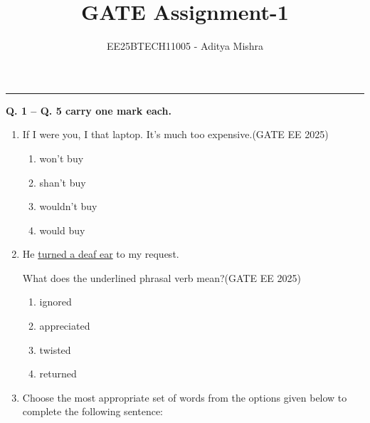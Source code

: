 



\title{GATE Assignment-1}
\author{EE25BTECH11005 - Aditya Mishra}
\maketitle
{\let\newpage\relax\maketitle}
\rule{\columnwidth}{0.3pt}

\textbf{Q. 1 -- Q. 5 carry one mark each.}

\begin{enumerate}
\item If I were you, I \underline{\hspace{2.5cm}} that laptop. It’s much too expensive.\hfill {(GATE EE 2025)}

\begin{multicols}{2}
\begin{enumerate}
\item won’t buy
\item shan’t buy
\item wouldn’t buy
\item would buy
\end{enumerate}
\end{multicols}



\item He \underline{turned a deaf ear} to my request. 

What does the underlined phrasal verb mean?\hfill {(GATE EE 2025)}

\begin{multicols}{2}
\begin{enumerate}
\item ignored
\item appreciated
\item twisted
\item returned
\end{enumerate}
\end{multicols}


\item Choose the most appropriate set of words from the options given below to complete the following sentence:


\end{enumerate}
